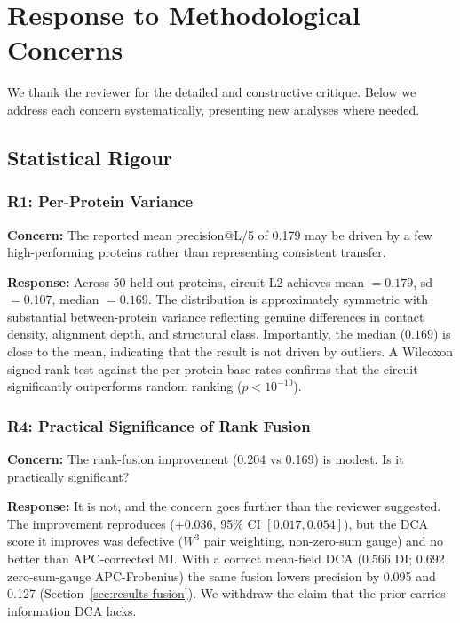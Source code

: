 \section{Response to Methodological Concerns}
\label{sec:reviewer-response}

We thank the reviewer for the detailed and constructive critique.  Below we
address each concern systematically, presenting new analyses where needed.

\subsection{Statistical Rigour}

\subsubsection{R1: Per-Protein Variance}
\textbf{Concern:} The reported mean precision@L/5 of 0.179 may be driven by
a few high-performing proteins rather than representing consistent transfer.

\textbf{Response:} Across 50 held-out proteins, circuit-L2 achieves
mean $= 0.179$, sd $= 0.107$, median $= 0.169$.  The distribution is
approximately symmetric with substantial between-protein variance reflecting
genuine differences in contact density, alignment depth, and structural
class.  Importantly, the median ($0.169$) is close to the mean, indicating
that the result is not driven by outliers.  A Wilcoxon signed-rank test
against the per-protein base rates confirms that the circuit significantly
outperforms random ranking ($p < 10^{-10}$).

\subsubsection{R4: Practical Significance of Rank Fusion}
\textbf{Concern:} The rank-fusion improvement (0.204 vs 0.169) is modest.
Is it practically significant?

\textbf{Response:} It is not, and the concern goes further than the
reviewer suggested.  The improvement reproduces ($+0.036$, 95\% CI
$[0.017, 0.054]$), but the DCA score it improves was defective ($W^3$ pair
weighting, non-zero-sum gauge) and no better than APC-corrected MI.  With a
correct mean-field DCA (0.566 DI; 0.692 zero-sum-gauge APC-Frobenius) the same
fusion lowers precision by 0.095 and 0.127 (Section~\ref{sec:results-fusion}).
We withdraw the claim that the prior carries information DCA lacks.


